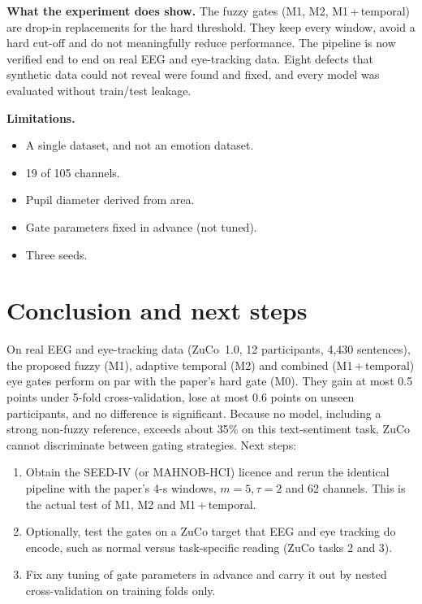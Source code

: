 \documentclass[10pt,a4paper]{article}
\begin{document}
\textbf{What the experiment does show.} The fuzzy gates (M1, M2, M1\,+\,temporal) are drop-in replacements for the hard threshold. They keep every window, avoid a hard cut-off and do not meaningfully reduce performance. The pipeline is now verified end to end on real EEG and eye-tracking data. Eight defects that synthetic data could not reveal were found and fixed, and every model was evaluated without train/test leakage.

\textbf{Limitations.}
\begin{itemize}
  \item A single dataset, and not an emotion dataset.
  \item 19 of 105 channels.
  \item Pupil diameter derived from area.
  \item Gate parameters fixed in advance (not tuned).
  \item Three seeds.
\end{itemize}

\section{Conclusion and next steps}
On real EEG and eye-tracking data (ZuCo~1.0, 12 participants, 4{,}430 sentences), the proposed fuzzy (M1), adaptive temporal (M2) and combined (M1\,+\,temporal) eye gates perform on par with the paper's hard gate (M0). They gain at most 0.5 points under 5-fold cross-validation, lose at most 0.6 points on unseen participants, and no difference is significant. Because no model, including a strong non-fuzzy reference, exceeds about 35\% on this text-sentiment task, ZuCo cannot discriminate between gating strategies. Next steps:
\begin{enumerate}
  \item Obtain the SEED-IV (or MAHNOB-HCI) licence and rerun the identical pipeline with the paper's 4-s windows, $m{=}5,\tau{=}2$ and 62 channels. This is the actual test of M1, M2 and M1\,+\,temporal.
  \item Optionally, test the gates on a ZuCo target that EEG and eye tracking do encode, such as normal versus task-specific reading (ZuCo tasks 2 and 3).
  \item Fix any tuning of gate parameters in advance and carry it out by nested cross-validation on training folds only.
\end{enumerate}

\appendix
\end{document}
